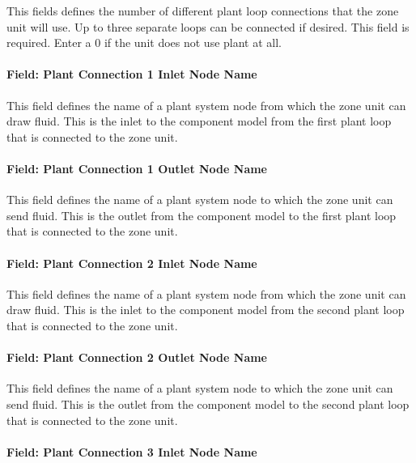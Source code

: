This fields defines the number of different plant loop connections that the zone unit will use. Up to three separate loops can be connected if desired. This field is required. Enter a 0 if the unit does not use plant at all.

\paragraph{Field: Plant Connection 1 Inlet Node Name}\label{field-plant-connection-1-inlet-node-name}

This field defines the name of a plant system node from which the zone unit can draw fluid. This is the inlet to the component model from the first plant loop that is connected to the zone unit.

\paragraph{Field: Plant Connection 1 Outlet Node Name}\label{field-plant-connection-1-outlet-node-name}

This field defines the name of a plant system node to which the zone unit can send fluid. This is the outlet from the component model to the first plant loop that is connected to the zone unit.

\paragraph{Field: Plant Connection 2 Inlet Node Name}\label{field-plant-connection-2-inlet-node-name}

This field defines the name of a plant system node from which the zone unit can draw fluid. This is the inlet to the component model from the second plant loop that is connected to the zone unit.

\paragraph{Field: Plant Connection 2 Outlet Node Name}\label{field-plant-connection-2-outlet-node-name}

This field defines the name of a plant system node to which the zone unit can send fluid. This is the outlet from the component model to the second plant loop that is connected to the zone unit.

\paragraph{Field: Plant Connection 3 Inlet Node Name}\label{field-plant-connection-3-inlet-node-name}

